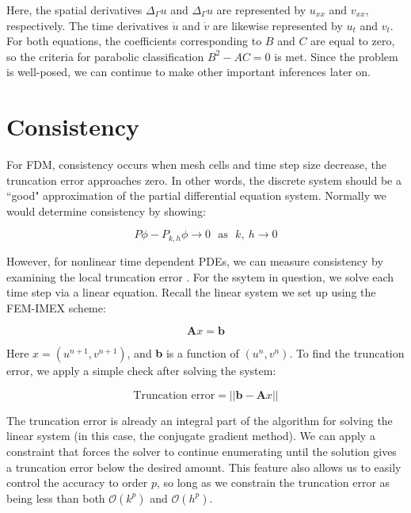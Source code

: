 \documentclass[12pt]{article}
\begin{document}
Here, the spatial derivatives $\Delta_\Gamma u$ and $\Delta_\Gamma u$ are represented by $u_{xx}$ and $v_{xx}$, respectively. The time derivatives $\dot{u}$ and $\dot{v}$ are likewise represented by $u_t$ and $v_t$. For both equations, the coefficients corresponding to $B$ and $C$ are equal to zero, so the criteria for parabolic classification $B^2-AC=0$ is met. Since the problem is well-posed, we can continue to make other important inferences later on.


\section{Consistency}

For FDM, consistency occurs when mesh cells and time step size decrease, the truncation error approaches zero. In other words, the discrete system should be a ``good" approximation of the partial differential equation system. Normally we would determine consistency by showing:

\begin{equation}
	P\phi - P_{k,h}\phi \rightarrow 0 ~~~\text{as} ~~~ k,~h \rightarrow 0
\end{equation}

However, for nonlinear time dependent PDEs, we can measure consistency by examining the local truncation error \cite{Tadmor2012}. For the ssytem in question, we solve each time step via a linear equation. Recall the linear system we set up using the FEM-IMEX scheme:

\begin{equation}
	\textbf{A}x=\textbf{b}
\end{equation}

\noindent Here $x=(u^{n+1}, v^{n+1})$, and \textbf{b} is a function of $(u^n, v^n)$. To find the truncation error, we apply a simple check after solving the system:

\begin{equation}\label{norm}
	\text{Truncation error} = ||\textbf{b}-\textbf{A}x|| 
\end{equation}

The truncation error is already an integral part of the algorithm for solving the linear system (in this case, the conjugate gradient method). We can apply a constraint that forces the solver to continue enumerating until the solution gives a truncation error below the desired amount. This feature also allows us to easily control the accuracy to order $p$, so long as we constrain the truncation error as being less than both $\mathcal{O}(k^p)$ and $\mathcal{O}(h^p)$. 
\end{document}
